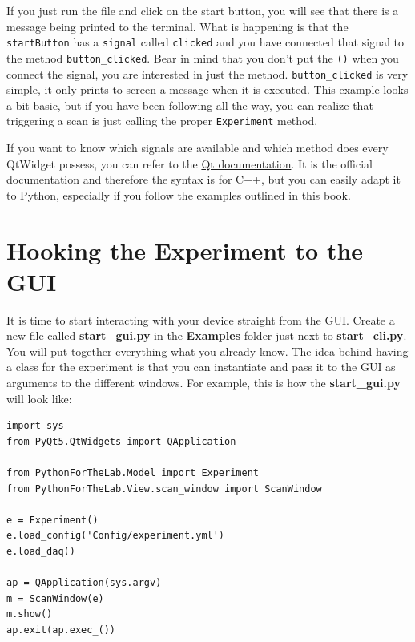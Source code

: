 If you just run the file and click on the start button, you will see
that there is a message being printed to the terminal. What is happening
is that the \texttt{startButton} has a \texttt{signal} called
\texttt{clicked} and you have connected that signal to the method
\texttt{button_clicked}. Bear in mind that you don't put the
\texttt{()} when you connect the signal, you are interested in just the
method. \texttt{button_clicked} is very simple, it only prints to
screen a message when it is executed. This example looks a bit basic,
but if you have been following all the way, you can realize that
triggering a scan is just calling the proper \texttt{Experiment} method.


If you want to know which signals are available and which method does
every QtWidget possess, you can refer to the
\href{http://doc.qt.io/qt-5/qtwidgets-module.html}{Qt documentation}. It
is the official documentation and therefore the syntax is for C++, but
you can easily adapt it to Python, especially if you follow the examples
outlined in this book.

\section{Hooking the Experiment to the GUI}\label{hooking-the-experiment-to-the-gui}
It is time to start interacting with your device straight from the
{GUI}. Create a new file called \textbf{start\_gui.py} in the
\textbf{Examples} folder just next to \textbf{start\_cli.py}. You will
put together everything what you already know. The idea behind having a
class for the experiment is that you can instantiate and pass it to the
{GUI} as arguments to the different windows. For example, this is how
the \textbf{start\_gui.py} will look like:

\begin{verbatim}
import sys
from PyQt5.QtWidgets import QApplication

from PythonForTheLab.Model import Experiment
from PythonForTheLab.View.scan_window import ScanWindow

e = Experiment()
e.load_config('Config/experiment.yml')
e.load_daq()

ap = QApplication(sys.argv)
m = ScanWindow(e)
m.show()
ap.exit(ap.exec_())
\end{verbatim}

